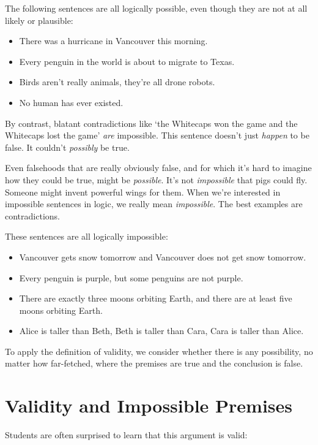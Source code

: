The following sentences are all logically possible, even though they are not at all likely or plausible:

\begin{itemize} 
\item There was a hurricane in Vancouver this morning. 
\item Every penguin in the world is about to migrate to Texas.
\item Birds aren't really animals, they're all drone robots. 
\item No human has ever existed.
\end{itemize}

By contrast, blatant contradictions like `the Whitecaps won the game and the Whitecaps lost the game' \emph{are} impossible. This sentence doesn't just \emph{happen} to be false. It couldn't \emph{possibly} be true.

Even falsehoods that are really obviously false, and for which it's hard to imagine how they could be true, might be \emph{possible}. It's not \emph{impossible} that pigs could fly. Someone might invent powerful wings for them. When we're interested in impossible sentences in logic, we really mean \emph{impossible}. The best examples are contradictions.

These sentences are all logically impossible:

\begin{itemize} 
\item Vancouver gets snow tomorrow and Vancouver does not get snow tomorrow. 
\item Every penguin is purple, but some penguins are not purple. 
\item There are exactly three moons orbiting Earth, and there are at least five moons orbiting Earth. 
\item Alice is taller than Beth, Beth is taller than Cara, Cara is taller than Alice. 
\end{itemize}

To apply the definition of validity, we consider whether there is any possibility, no matter how far-fetched, where the premises are true and the conclusion is false.

\section{Validity and Impossible Premises}

Students are often surprised to learn that this argument is valid:

